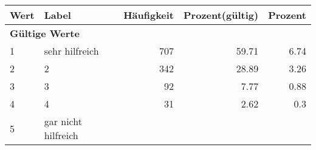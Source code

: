      \begin{longtable}{lXrrr}
     \toprule
     \textbf{Wert} & \textbf{Label} & \textbf{Häufigkeit} & \textbf{Prozent(gültig)} & \textbf{Prozent} \\
     \endhead
     \midrule
     \multicolumn{5}{l}{\textbf{Gültige Werte}}\\

     1 &
     \multicolumn{1}{X}{ sehr hilfreich   } &


       \num{707} &
       \num[round-mode=places,round-precision=2]{59.71} &
         \num[round-mode=places,round-precision=2]{6.74} \\

     2 &
     \multicolumn{1}{X}{ 2   } &


       \num{342} &
       \num[round-mode=places,round-precision=2]{28.89} &
         \num[round-mode=places,round-precision=2]{3.26} \\

     3 &
     \multicolumn{1}{X}{ 3   } &


       \num{92} &
       \num[round-mode=places,round-precision=2]{7.77} &
         \num[round-mode=places,round-precision=2]{0.88} \\

     4 &
     \multicolumn{1}{X}{ 4   } &


       \num{31} &
       \num[round-mode=places,round-precision=2]{2.62} &
         \num[round-mode=places,round-precision=2]{0.3} \\

     5 &
     \multicolumn{1}{X}{ gar nicht hilfreich   } &



\end{longtable}

